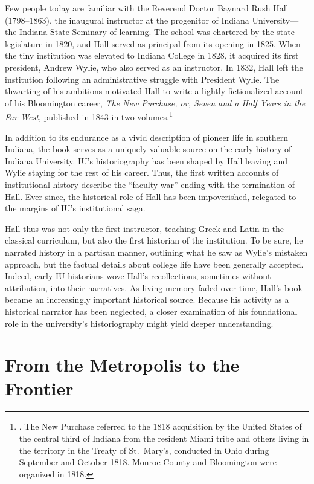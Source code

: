\documentclass[
  american,
  letterpaper,
]{scrreprt}
\begin{document}
Few people today are familiar with the Reverend Doctor Baynard Rush Hall
(1798--1863), the inaugural instructor at the progenitor of Indiana
University---the Indiana State Seminary of learning. The school was
chartered by the state legislature in 1820, and Hall served as principal
from its opening in 1825. When the tiny institution was elevated to
Indiana College in 1828, it acquired its first president, Andrew Wylie,
who also served as an instructor. In 1832, Hall left the institution
following an administrative struggle with President Wylie. The thwarting
of his ambitions motivated Hall to write a lightly fictionalized account
of his Bloomington career, \emph{The New Purchase, or, Seven and a Half
Years in the Far West}, published in 1843 in two volumes.\footnote{. The New Purchase referred to the 1818 acquisition by the United
  States of the central third of Indiana from the resident Miami tribe
  and others living in the territory in the Treaty of St.~Mary's,
  conducted in Ohio during September and October 1818. Monroe County and
  Bloomington were organized in 1818.}

In addition to its endurance as a vivid description of pioneer life in
southern Indiana, the book serves as a uniquely valuable source on the
early history of Indiana University. IU's historiography has been shaped
by Hall leaving and Wylie staying for the rest of his career. Thus, the
first written accounts of institutional history describe the ``faculty
war'' ending with the termination of Hall. Ever since, the historical
role of Hall has been impoverished, relegated to the margins of IU's
institutional saga.

Hall thus was not only the first instructor, teaching Greek and Latin in
the classical curriculum, but also the first historian of the
institution. To be sure, he narrated history in a partisan manner,
outlining what he saw as Wylie's mistaken approach, but the factual
details about college life have been generally accepted. Indeed, early
IU historians wove Hall's recollections, sometimes without attribution,
into their narratives. As living memory faded over time, Hall's book
became an increasingly important historical source. Because his activity
as a historical narrator has been neglected, a closer examination of his
foundational role in the university's historiography might yield deeper
understanding.

\section{From the Metropolis to the
Frontier}\label{from-the-metropolis-to-the-frontier}
\end{document}
